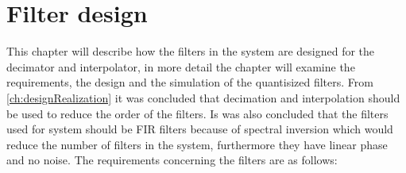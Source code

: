 \chapter{Filter design}
This chapter will describe how the filters in the system are designed for the decimator and interpolator, in more detail the chapter will examine the requirements, the design and the simulation of the quantisized filters. From \autoref{ch:designRealization} it was concluded that decimation and interpolation should be used to reduce the order of the filters.  
Is was also concluded that the filters used for system should be FIR filters because of spectral inversion which would reduce the number of filters in the system, furthermore they have linear phase and no noise. The requirements concerning the filters are as follows:   





%

%

%